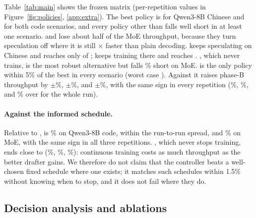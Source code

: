 Table~\ref{tab:main} shows the frozen matrix (per-repetition values in Figure~\ref{fig:policies}, \cref{app:extra}). The best policy is  for Qwen3-8B Chinese and  for both code scenarios, and every policy other than  falls well short in at least one scenario.  and  lose about half of the MoE throughput, because they turn speculation off where it is still $\times$ faster than plain decoding.  keeps speculating on Chinese and reaches only  of ;  keeps training there and reaches . , which never trains, is the most robust alternative but falls \% short on MoE.  is the only policy within 5\% of the best in every scenario (worst case ). Against  it raises phase-B throughput by $\pm$\%, $\pm$\%, and $\pm$\%, with the same sign in every repetition (\%, \%, and \% over  for the whole run).

\paragraph{Against the informed schedule.} Relative to ,  is \% on Qwen3-8B code, within the run-to-run spread, and \% on MoE, with the same sign in all three repetitions. , which never stops training, ends close to  (\%, \%, \%): continuous training costs as much throughput as the better drafter gains. We therefore do not claim that the controller beats a well-chosen fixed schedule where one exists; it matches such schedules within 1.5\% without knowing when to stop, and it does not fail where they do.

\subsection{Decision analysis and ablations}\label{sec:levers}

\begin{table}[t]
\caption{What  did in phase B (means over three runs): share of time with speculation on, mean duty, drafter swaps, acceptance at the start and end of B, tokens trained in the run, and the training tests' decisions as a share of ticks (below 5\% omitted).}
\label{tab:behaviour}
\centering\small

\end{table}

